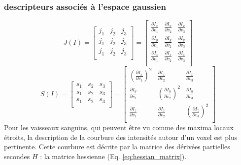 \subsubsection{descripteurs associés à l'espace gaussien}
\label{sec:EA:rehaussement:hessienne}
\begin{equation}
  J(I) =
  \begin{bmatrix}
  j_{1} & j_{2} & j_{3} \\
  j_{1} & j_{2} & j_{3} \\
  j_{1} & j_{2} & j_{3} \\
  \end{bmatrix}
    =
  \begin{bmatrix}
  \frac{\partial I_x}{\partial v_1} & \frac{\partial I_x}{\partial v_2} & \frac{\partial I_x}{\partial v_3} \\
  \frac{\partial I_y}{\partial v_1} & \frac{\partial I_y}{\partial v_2} & \frac{\partial I_y}{\partial v_3} \\
  \frac{\partial I_z}{\partial v_1} & \frac{\partial I_z}{\partial v_2} & \frac{\partial I_z}{\partial v_3} \\
  \end{bmatrix}
  \label{eq:jacobian}
\end{equation}
\begin{equation}
  S(I) =
  \begin{bmatrix}
  s_{1} & s_{2} & s_{3} \\
  s_{1} & s_{2} & s_{3} \\
  s_{1} & s_{2} & s_{3} \\
  \end{bmatrix}
    =
  \begin{bmatrix}
  \left( \frac{\partial I_x}{\partial v_1} \right)^2 & \frac{\partial I_x}{\partial v_2} & \frac{\partial I_x}{\partial v_3} \\
  \frac{\partial I_y}{\partial v_1} & \left( \frac{\partial I_y}{\partial v_2} \right)^2 & \frac{\partial I_y}{\partial v_3} \\
  \frac{\partial I_z}{\partial v_1} & \frac{\partial I_z}{\partial v_2} & \left( \frac{\partial I_z}{\partial v_3} \right)^2 \\
  \end{bmatrix}
  \label{eq:structure}
\end{equation}
Pour les vaisseaux sanguins, qui peuvent être vu comme des maxima locaux étroits, la description de la courbure des intensités autour d'un voxel est plus pertinente. Cette courbure est décrite par la matrice des dérivées partielles secondes $H$ : la matrice hessienne (Eq. \ref{eq:hessian_matrix}). 

